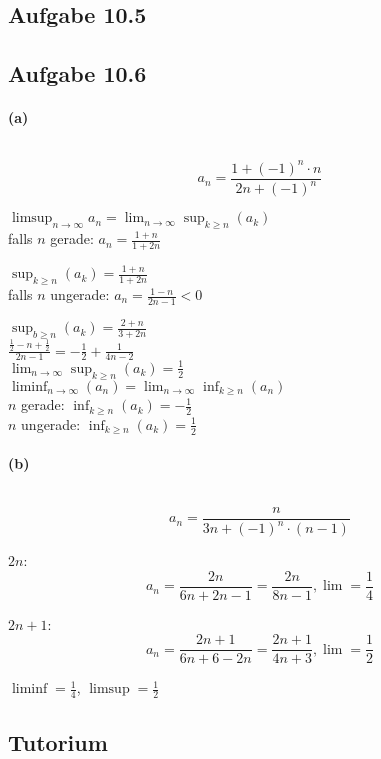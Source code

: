 \subsection{Aufgabe 10.5}

\newpage

\subsection{Aufgabe 10.6}

\paragraph{(a)}
$ $\newline

\begin{equation*}
a_n=\frac{1+(-1)^n\cdot n}{2n+(-1)^n}
\end{equation*}

$\limsup_{n\rightarrow\infty}a_n=\lim_{n\rightarrow\infty}\sup_{k\geq n}(a_k)$\\

falls $n$ gerade: $a_n=\frac{1+n}{1+2n}$

$\sup_{k\geq n}(a_k)=\frac{1+n}{1+2n}$\\

falls $n$ ungerade: $a_n=\frac{1-n}{2n-1}<0$

$\sup_{b\geq n}(a_k)=\frac{2+n}{3+2n}$\\

$\frac{\frac{1}{2}-n+\frac{1}{2}}{2n-1}=-\frac{1}{2}+\frac{1}{4n-2}$\\

$\lim_{n\rightarrow\infty}\sup_{k\geq n}(a_k)=\frac{1}{2}$\\

$\liminf_{n\rightarrow\infty}(a_n)=\lim_{n\rightarrow\infty}\inf_{k\geq n}(a_n)$\\

$n$ gerade: $\inf_{k\geq n}(a_k)=-\frac{1}{2}$\\

$n$ ungerade: $\inf_{k\geq n}(a_k)=\frac{1}{2}$

\paragraph{(b)}
$ $\newline

\begin{equation*}
a_n=\frac{n}{3n+(-1)^n\cdot(n-1)}
\end{equation*}

$2n$:
\begin{equation*}
a_n=\frac{2n}{6n+2n-1}=\frac{2n}{8n-1},\lim=\frac{1}{4}
\end{equation*}

$2n+1$:
\begin{equation*}
a_n=\frac{2n+1}{6n+6-2n}=\frac{2n+1}{4n+3},\lim=\frac{1}{2}
\end{equation*}

$\liminf=\frac{1}{4}$, $\limsup=\frac{1}{2}$

\newpage

\subsection{Tutorium}
